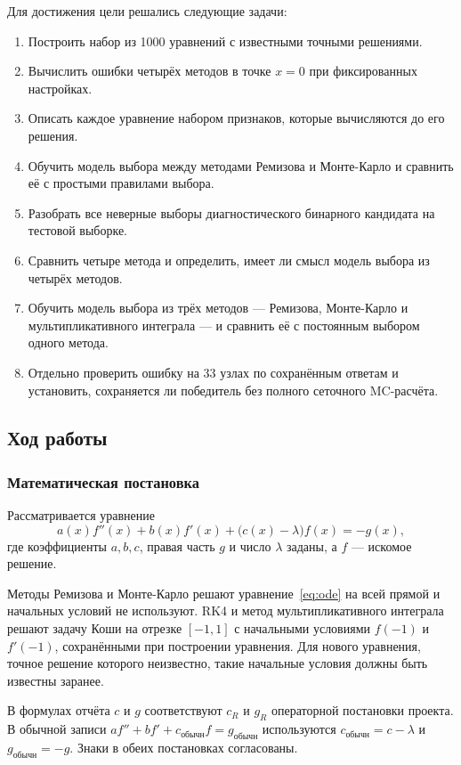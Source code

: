\documentclass[14pt,a4paper]{extarticle}
\begin{document}
Для достижения цели решались следующие задачи:
\begin{enumerate}
\item Построить набор из 1000 уравнений с известными точными решениями.
\item Вычислить ошибки четырёх методов в точке $x=0$ при фиксированных
настройках.
\item Описать каждое уравнение набором признаков, которые вычисляются
до его решения.
\item Обучить модель выбора между методами Ремизова и Монте-Карло
и сравнить её с простыми правилами выбора.
\item Разобрать все неверные выборы диагностического бинарного
кандидата на тестовой выборке.
\item Сравнить четыре метода и определить, имеет ли смысл модель выбора
из четырёх методов.
\item Обучить модель выбора из трёх методов --- Ремизова, Монте-Карло
и мультипликативного интеграла --- и сравнить её с постоянным выбором
одного метода.
\item Отдельно проверить ошибку на 33 узлах по сохранённым ответам
и установить, сохраняется ли победитель без полного сеточного MC-расчёта.
\end{enumerate}

\subsection{Ход работы}
\subsubsection{Математическая постановка}
Рассматривается уравнение
\begin{equation}\label{eq:ode}
a(x)f''(x)+b(x)f'(x)+\bigl(c(x)-\lambda\bigr)f(x)=-g(x),
\end{equation}
где коэффициенты $a,b,c$, правая часть $g$ и число $\lambda$ заданы,
а $f$ --- искомое решение.

Методы Ремизова и Монте-Карло решают уравнение~\eqref{eq:ode} на всей
прямой и начальных условий не используют. RK4 и метод мультипликативного
интеграла решают задачу Коши на отрезке $[-1,1]$ с начальными условиями
$f(-1)$ и $f'(-1)$, сохранёнными при построении уравнения. Для нового
уравнения, точное решение которого неизвестно, такие начальные условия
должны быть известны заранее.

В формулах отчёта $c$ и $g$ соответствуют $c_R$ и $g_R$
операторной постановки проекта. В обычной записи
$af''+bf'+c_{\text{обычн}}f=g_{\text{обычн}}$ используются
$c_{\text{обычн}}=c-\lambda$ и $g_{\text{обычн}}=-g$.
Знаки в обеих постановках согласованы.
\end{document}
